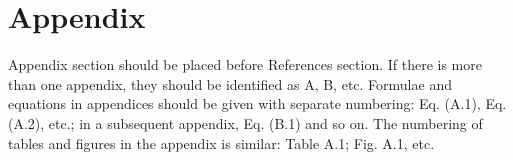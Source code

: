 \documentclass[final,3p,times,twocolumn]{elsarticle}
\begin{document}
\section*{Appendix}
Appendix section should be placed before References section. 
If there is more than one appendix, they should be identified as A, B, etc. 
Formulae and equations in appendices should be given with separate numbering: Eq. (A.1), Eq. (A.2), etc.; in a subsequent appendix, Eq. (B.1) and so on. 
The numbering of tables and figures in the appendix is similar: Table A.1; Fig. A.1, etc.





% 
% 
% 
% 
% 
% 
% 
% 
% 
% 
% 
% 

\vspace{-0.3cm}
\end{document}
